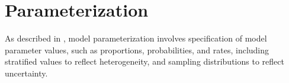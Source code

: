 \section{Parameterization}\label{model.par}
As described in , model parameterization involves
specification of model parameter values, such as proportions, probabilities, and rates,
including stratified values to reflect heterogeneity,
and sampling distributions to reflect uncertainty.



